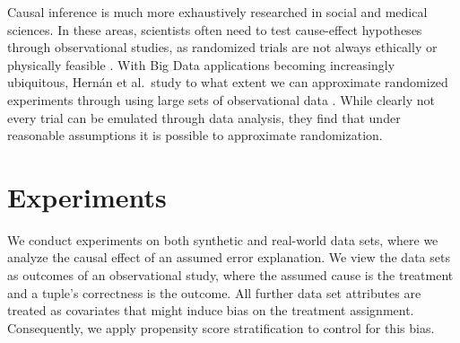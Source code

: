\documentclass[acmsmall, nonacm, screen]{acmart} %
\begin{document}
Causal inference is much more exhaustively researched in social and medical sciences. In these areas, scientists often need to test cause-effect hypotheses through observational studies, as randomized trials are not always ethically or physically feasible \cite{Rosenbaum02}.
With Big Data applications becoming increasingly ubiquitous, Hern\'{a}n et al.\ study to what extent we can approximate randomized experiments through using large sets of observational data \cite{Robins16}.
While clearly not every trial can be emulated through data analysis, they find that under reasonable assumptions it is possible to approximate randomization.\\


\section{Experiments}
We conduct experiments on both synthetic and real-world data sets, where we analyze the causal effect of an assumed error explanation.
We view the data sets as outcomes of an observational study, where the assumed cause is the treatment and a tuple's correctness is the outcome.
All further data set attributes are treated as covariates that might induce bias on the treatment assignment.
Consequently, we apply propensity score stratification to control for this bias.\\
\end{document}
